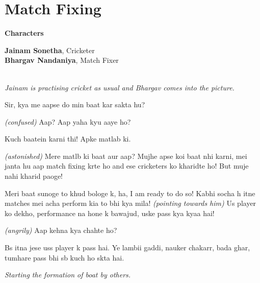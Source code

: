 \documentclass[12pt,a4paper,oneside]{memoir}
\begin{document}
\chapter*{Match Fixing}

\begin{center}

\textbf{Characters}

\vskip 1cm

\textbf{Jainam Sonetha}, Cricketer \\
\textbf{Bhargav Nandaniya}, Match Fixer \\
\vskip 1cm
\end{center}

\begin{description}[itemsep=1ex,leftmargin=1cm]
\setlength{\parskip}{5pt}

\item[] \hfill \\

\textit{Jainam is practising cricket as usual and Bhargav comes into the picture.}

\item[BHARGAV] Sir, kya me aapse do min baat kar sakta hu?

\item[JAINAM] \textit{(confused)} Aap? Aap yaha kyu aaye ho?

\item[BHARGAV] Kuch baatein karni thi! Apke matlab ki.

\item[JAINAM] \textit{(astonished)} Mere matlb ki baat aur aap? Mujhe apse koi baat nhi karni, mei janta hu aap match fixing krte ho and ese cricketers ko kharidte ho! But muje nahi kharid paoge!

\item[BHARGAV] Meri baat sunoge to khud bologe k, ha, I am ready to do so! Kabhi socha h itne matches mei acha perform kia to bhi kya mila! \textit{(pointing towards him)} Us player ko dekho, performance na hone k bawajud, uske pass kya kyaa hai!

\item[JAINAM] \textit{(angrily)} Aap kehna kya chahte ho?

\item[BHARGAV] Bs itna jese uss player k pass hai. Ye lambii gaddi, nauker chakarr, bada ghar, tumhare pass bhi sb kuch ho skta hai.

\textit{Starting the formation of boat by others.}


\end{description}
\end{document}

